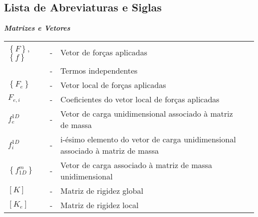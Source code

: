 \clearpage
\setcounter{page}{21}

\vspace*{1.cm}
\begin{center}
\chapter*{Lista de Abreviaturas e Siglas}
\end{center}

\vspace{1cm}
\noindent

\textbf{\emph{Matrizes e Vetores}}\\

\noindent
\begin{tabular}[!thp]{l c p{.72\linewidth} c}
$\left\{F \right\}$,$\left\{f \right\}$& - & Vetor de forças aplicadas\\
					& - & Termos independentes\\
$\left\{F_{e} \right\}$ & - & Vetor local de forças aplicadas\\
$F_{e,i}$ & - & Coeficientes do vetor local de forças aplicadas\\
$f^{1D}_{e}$ & - & Vetor de carga unidimensional associado à matriz de massa\\
$f^{1D}_{i}$ & - & i-ésimo elemento do vetor de carga unidimensional associado à matriz de massa\\
$\left\{ f^{m}_{1D} \right\}$ & - & Vetor de carga associado à matriz de massa unidimensional\\

$\left[K \right]$ & - & Matriz de rigidez global\\
$\left[K_{e} \right]$ & - & Matriz de rigidez local\\


\end{tabular}
